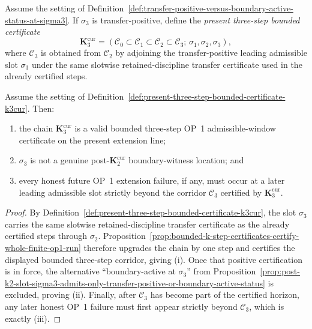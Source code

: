 \begin{definition}
\label{def:present-three-step-bounded-certificate-k3cur}
Assume the setting of Definition~\ref{def:transfer-positive-versus-boundary-active-status-at-sigma3}. If $\sigma_3$ is transfer-positive, define the \emph{present three-step bounded certificate}
\[
 \mathbf K_3^{\mathrm{cur}}=(\mathcal C_0\subset \mathcal C_1\subset \mathcal C_2\subset \mathcal C_3;\,\sigma_1,\sigma_2,\sigma_3),
\]
where $\mathcal C_3$ is obtained from $\mathcal C_2$ by adjoining the transfer-positive leading admissible slot $\sigma_3$ under the same slotwise retained-discipline transfer certificate used in the already certified steps.
\end{definition}

\begin{proposition}
\label{prop:transfer-positive-status-at-sigma3-certifies-k3cur-and-discharges-local-boundary-channel}
Assume the setting of Definition~\ref{def:present-three-step-bounded-certificate-k3cur}. Then:
\begin{enumerate}[label=(\roman*)]
 \item the chain $\mathbf K_3^{\mathrm{cur}}$ is a valid bounded three-step OP~1 admissible-window certificate on the present extension line;
 \item $\sigma_3$ is not a genuine post-$\mathbf K_2^{\mathrm{cur}}$ boundary-witness location; and
 \item every honest future OP~1 extension failure, if any, must occur at a later leading admissible slot strictly beyond the corridor $\mathcal C_3$ certified by $\mathbf K_3^{\mathrm{cur}}$.
\end{enumerate}
\end{proposition}

\begin{proof}
By Definition~\ref{def:present-three-step-bounded-certificate-k3cur}, the slot $\sigma_3$ carries the same slotwise retained-discipline transfer certificate as the already certified steps through $\sigma_2$. Proposition~\ref{prop:bounded-k-step-certificates-certify-whole-finite-op1-run} therefore upgrades the chain by one step and certifies the displayed bounded three-step corridor, giving (i). Once that positive certification is in force, the alternative ``boundary-active at $\sigma_3$'' from Proposition~\ref{prop:post-k2-slot-sigma3-admits-only-transfer-positive-or-boundary-active-status} is excluded, proving (ii). Finally, after $\mathcal C_3$ has become part of the certified horizon, any later honest OP~1 failure must first appear strictly beyond $\mathcal C_3$, which is exactly (iii).
\end{proof}

